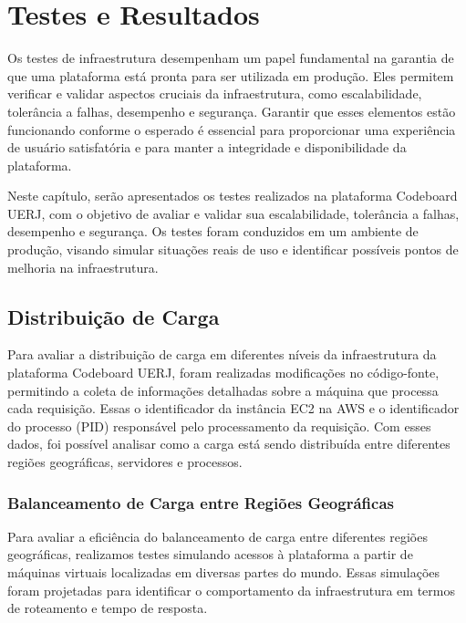 \chapter{Testes e Resultados}

Os testes de infraestrutura desempenham um papel fundamental na garantia de que uma plataforma está pronta para ser utilizada em produção. Eles permitem verificar e validar aspectos cruciais da infraestrutura, como escalabilidade, tolerância a falhas, desempenho e segurança. Garantir que esses elementos estão funcionando conforme o esperado é essencial para proporcionar uma experiência de usuário satisfatória e para manter a integridade e disponibilidade da plataforma.

Neste capítulo, serão apresentados os testes realizados na plataforma Codeboard UERJ, com o objetivo de avaliar e validar sua escalabilidade, tolerância a falhas, desempenho e segurança. Os testes foram conduzidos em um ambiente de produção, visando simular situações reais de uso e identificar possíveis pontos de melhoria na infraestrutura.


\section{Distribuição de Carga}

Para avaliar a distribuição de carga em diferentes níveis da infraestrutura da plataforma Codeboard UERJ, foram realizadas modificações no código-fonte, permitindo a coleta de informações detalhadas sobre a máquina que processa cada requisição. Essas o identificador da instância EC2 na AWS e o identificador do processo (PID) responsável pelo processamento da requisição. Com esses dados, foi possível analisar como a carga está sendo distribuída entre diferentes regiões geográficas, servidores e processos.

\subsection{Balanceamento de Carga entre Regiões Geográficas}

Para avaliar a eficiência do balanceamento de carga entre diferentes regiões geográficas, realizamos testes simulando acessos à plataforma a partir de máquinas virtuais localizadas em diversas partes do mundo. Essas simulações foram projetadas para identificar o comportamento da infraestrutura em termos de roteamento e tempo de resposta.

